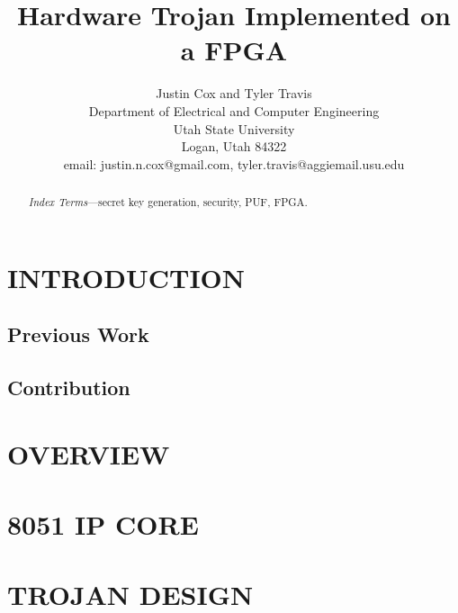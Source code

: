 \documentclass[letterpaper, 10 pt, conference]{ieeeconf}  %
\title{\LARGE \bf
Hardware Trojan Implemented on a FPGA  
}
\author{Justin Cox and Tyler Travis
\\ \small{Department of Electrical and Computer Engineering}
\\ \small{Utah State University}
\\ \small{Logan, Utah 84322}
\\ \small{email: justin.n.cox@gmail.com, tyler.travis@aggiemail.usu.edu}
}
\begin{document}
\maketitle
\thispagestyle{empty}
\pagestyle{empty}


\begin{abstract}


\emph{Index Terms}---secret key generation, security, PUF, FPGA.

\end{abstract}

\section{INTRODUCTION}
  

\subsection{Previous Work}



\subsection{Contribution}



\section{OVERVIEW}



\section{8051 IP CORE}



\section{TROJAN DESIGN}
\end{document}
